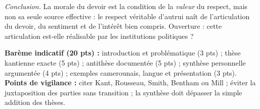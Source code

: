\documentclass[11pt]{article}
\begin{document}
\begin{corrige}
\emph{Conclusion.} La morale du devoir est la condition de la \emph{valeur} du respect, mais non sa seule source effective : le respect véritable d'autrui naît de l'articulation du devoir, du sentiment et de l'intérêt bien compris. Ouverture : cette articulation est-elle réalisable par les institutions politiques ?

\textbf{Barème indicatif (20 pts) :} introduction et problématique (3 pts) ; thèse kantienne exacte (5 pts) ; antithèse documentée (5 pts) ; synthèse personnelle argumentée (4 pts) ; exemples camerounais, langue et présentation (3 pts).
\textbf{Points de vigilance :} citer Kant, Rousseau, Smith, Bentham ou Mill ; éviter la juxtaposition des parties sans transition ; la synthèse doit dépasser la simple addition des thèses.
\end{corrige}
\end{document}
